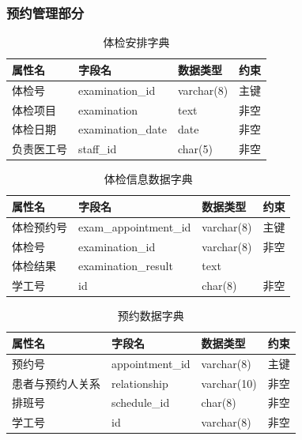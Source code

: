 \documentclass{article}
\begin{document}
\subsubsection{预约管理部分}

\begin{table}[H]
    \centering
    \begin{tabularx}{\textwidth}{|p{2.2cm}|p{3.2cm}|p{4.8cm}|p{5cm}|}
    \toprule
    \textbf{属性名} & \textbf{字段名} & \textbf{数据类型} & \textbf{约束} \\ \midrule
    体检号 & examination\_id & varchar(8) & 主键 \\ \midrule
    体检项目 & examination & text & 非空 \\ \midrule
    体检日期 & examination\_date & date & 非空 \\ \midrule
    负责医工号 & staff\_id & char(5) & 非空 \\ \bottomrule
    \end{tabularx}
    \caption{体检安排字典}
    \label{tab:examination_arrangement}
\end{table}

\begin{table}[H]
    \centering
    \begin{tabularx}{\textwidth}{|p{2.2cm}|p{3.3cm}|p{4.7cm}|p{5cm}|}
    \toprule
    \textbf{属性名} & \textbf{字段名} & \textbf{数据类型} & \textbf{约束} \\ \midrule
    体检预约号 & exam\_appointment\_id & varchar(8) & 主键 \\ \midrule
    体检号 & examination\_id & varchar(8) & 非空 \\ \midrule
    体检结果 & examination\_result & text &  \\ \midrule
    学工号 & id & char(8) & 非空 \\ \bottomrule
    \end{tabularx}
    \caption{体检信息数据字典}
    \label{tab:examination_appointment}
\end{table}

\begin{table}[H]
    \centering
    \begin{tabularx}{\textwidth}{|p{2.2cm}|p{3.2cm}|p{4.8cm}|p{5cm}|}
    \toprule
    \textbf{属性名} & \textbf{字段名} & \textbf{数据类型} & \textbf{约束} \\ \midrule
    预约号 & appointment\_id & varchar(8) & 主键 \\ \midrule
    患者与预约人关系 & relationship & varchar(10) & 非空 \\ \midrule
    排班号 & schedule\_id & char(8) & 非空 \\ \midrule
    学工号 & id & varchar(8) & 非空 \\ \bottomrule
    \end{tabularx}
    \caption{预约数据字典}
    \label{tab:appointment}
\end{table}
\end{document}
